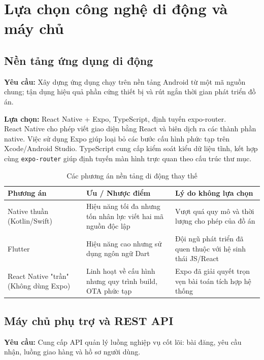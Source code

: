 \documentclass[../main.tex]{subfiles}%
\begin{document}
\section{Lựa chọn công nghệ di động và máy chủ}

\subsection{Nền tảng ứng dụng di động}
\textbf{Yêu cầu:} Xây dựng ứng dụng chạy trên nền tảng Android từ một mã nguồn chung; tận dụng hiệu quả phần cứng thiết bị và rút ngắn thời gian phát triển đồ án.

\textbf{Lựa chọn:} React Native + Expo, TypeScript, định tuyến expo-router.\\
React Native cho phép viết giao diện bằng React và biên dịch ra các thành phần native. Việc sử dụng Expo giúp loại bỏ các bước cấu hình phức tạp trên Xcode/Android Studio. TypeScript cung cấp kiểm soát kiểu dữ liệu tĩnh, kết hợp cùng \texttt{expo-router} giúp định tuyến màn hình trực quan theo cấu trúc thư mục.

\begin{table}[H]
\centering
\renewcommand{\arraystretch}{1.5}
\begin{tabular}{|p{4.5cm}|p{5cm}|p{5.5cm}|}
\hline
\textbf{Phương án} & \textbf{Ưu / Nhược điểm} & \textbf{Lý do không lựa chọn} \\ \hline
Native thuần (Kotlin/Swift) & Hiệu năng tối đa nhưng tốn nhân lực viết hai mã nguồn độc lập & Vượt quá quy mô và thời lượng cho phép của đồ án \\ \hline
Flutter & Hiệu năng cao nhưng sử dụng ngôn ngữ Dart & Đội ngũ phát triển đã quen thuộc với hệ sinh thái JS/React \\ \hline
React Native "trần" (Không dùng Expo) & Linh hoạt về cấu hình nhưng quy trình build, OTA phức tạp & Expo đã giải quyết trọn vẹn bài toán tích hợp hệ thống \\ \hline
\end{tabular}
\caption{Các phương án nền tảng di động thay thế}
\end{table}

\subsection{Máy chủ phụ trợ và REST API}
\textbf{Yêu cầu:} Cung cấp API quản lý luồng nghiệp vụ cốt lõi: bài đăng, yêu cầu nhận, luồng giao hàng và hồ sơ người dùng.\\
\end{document}
